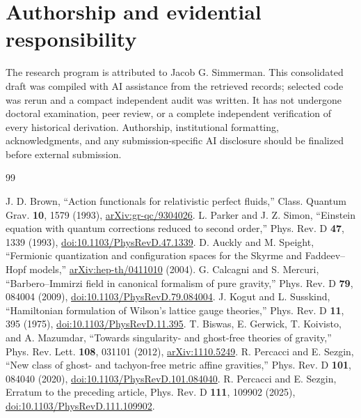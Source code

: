 \documentclass[11pt,oneside]{report}
\begin{document}
\section{Authorship and evidential responsibility}
The research program is attributed to Jacob G. Simmerman. This consolidated draft was compiled with AI assistance from the retrieved records; selected code was rerun and a compact independent audit was written. It has not undergone doctoral examination, peer review, or a complete independent verification of every historical derivation. Authorship, institutional formatting, acknowledgments, and any submission-specific AI disclosure should be finalized before external submission.
\begin{thebibliography}{99}
 J. D. Brown, ``Action functionals for relativistic perfect fluids,'' Class. Quantum Grav. \textbf{10}, 1579 (1993), \href{https://arxiv.org/abs/gr-qc/9304026}{arXiv:gr-qc/9304026}.
 L. Parker and J. Z. Simon, ``Einstein equation with quantum corrections reduced to second order,'' Phys. Rev. D \textbf{47}, 1339 (1993), \href{https://doi.org/10.1103/PhysRevD.47.1339}{doi:10.1103/PhysRevD.47.1339}.
 D. Auckly and M. Speight, ``Fermionic quantization and configuration spaces for the Skyrme and Faddeev--Hopf models,'' \href{https://arxiv.org/abs/hep-th/0411010}{arXiv:hep-th/0411010} (2004).
 G. Calcagni and S. Mercuri, ``Barbero--Immirzi field in canonical formalism of pure gravity,'' Phys. Rev. D \textbf{79}, 084004 (2009), \href{https://doi.org/10.1103/PhysRevD.79.084004}{doi:10.1103/PhysRevD.79.084004}.
 J. Kogut and L. Susskind, ``Hamiltonian formulation of Wilson's lattice gauge theories,'' Phys. Rev. D \textbf{11}, 395 (1975), \href{https://doi.org/10.1103/PhysRevD.11.395}{doi:10.1103/PhysRevD.11.395}.
 T. Biswas, E. Gerwick, T. Koivisto, and A. Mazumdar, ``Towards singularity- and ghost-free theories of gravity,'' Phys. Rev. Lett. \textbf{108}, 031101 (2012), \href{https://arxiv.org/abs/1110.5249}{arXiv:1110.5249}.
 R. Percacci and E. Sezgin, ``New class of ghost- and tachyon-free metric affine gravities,'' Phys. Rev. D \textbf{101}, 084040 (2020), \href{https://doi.org/10.1103/PhysRevD.101.084040}{doi:10.1103/PhysRevD.101.084040}.
 R. Percacci and E. Sezgin, Erratum to the preceding article, Phys. Rev. D \textbf{111}, 109902 (2025), \href{https://doi.org/10.1103/PhysRevD.111.109902}{doi:10.1103/PhysRevD.111.109902}.
\end{thebibliography}
\end{document}
